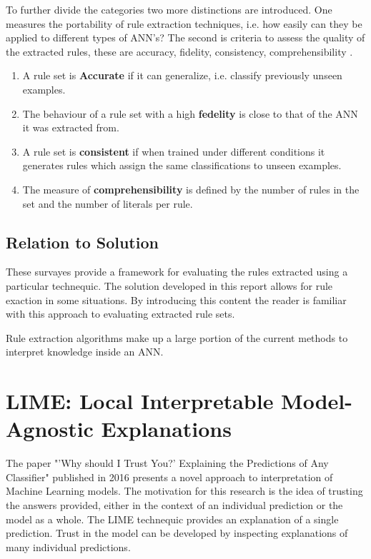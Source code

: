 To further divide the categories two more distinctions are introduced. One measures the portability of rule extraction techniques, i.e. how easily can they be applied to different types of ANN's? The second is criteria to assess the quality of the extracted rules, these are accuracy, fidelity, consistency, comprehensibility \cite{andrews1995survey}.

\begin{enumerate}
\item A rule set is \textbf{Accurate} if it can generalize, i.e. classify previously unseen examples.
\item The behaviour of a rule set with a high \textbf{fedelity} is close to that of the ANN it was extracted from.
\item A rule set is \textbf{consistent} if when trained under different conditions it generates rules which assign the same classifications to unseen examples.
\item The measure of \textbf{comprehensibility} is defined by the number of rules in the set and the number of literals per rule.
\end{enumerate}

\subsection{Relation to Solution}
These survayes provide a framework for evaluating the rules extracted using a particular technequic. The solution developed in this report allows for rule exaction in some situations. By introducing this content the reader is familiar with this approach to evaluating extracted rule sets.

Rule extraction algorithms make up a large portion of the current methods to interpret knowledge inside an ANN.

\section{LIME: Local Interpretable Model-Agnostic Explanations}
The paper "'Why should I Trust You?' Explaining the Predictions of Any Classifier" \cite{ribeiro2016should} published in 2016 presents a novel approach to interpretation of Machine Learning models. The motivation for this research is the idea of trusting the answers provided, either in the context of an individual prediction or the model as a whole. The LIME technequic provides an explanation of a single prediction. Trust in the model can be developed by inspecting explanations of many individual predictions.

